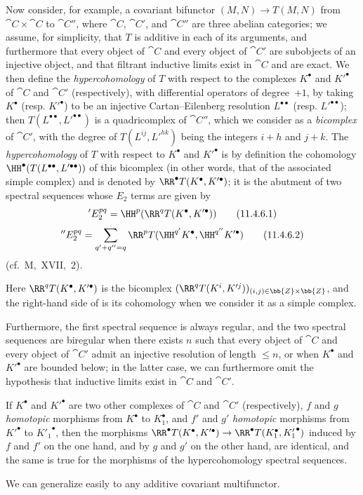 \begin{env}[11.4.6]
\label{0.11.4.6}
Now consider, for example, a covariant bifunctor $(M, N) \rightarrow T(M, N)$ from $\cat{C} \times \cat{C}$ to $\cat{C}''$, where $\cat{C}$, $\cat{C}'$, and $\cat{C}''$ are three abelian categories;
we assume, for simplicity, that $T$ is additive in each of its arguments, and furthermore that every object of $\cat{C}$ and every object of $\cat{C}'$ are subobjects of an injective object, 
and that filtrant inductive limits exist in $\cat{C}$ and are exact.
We then define the \emph{hypercohomology} of $T$ with respect to the complexes $K^\bullet$ and $K'^\bullet$ of $\cat{C}$ and $\cat{C}'$ (respectively), with differential operators of degree~$+1$, by taking $K^\bullet$ (resp. $K'^\bullet$) to be an injective Cartan--Eilenberg resolution $L^{\bullet\bullet}$ (resp. $L'^{\bullet\bullet}$);
then $T(L^{\bullet\bullet}, L'^{\bullet\bullet})$ is a quadricomplex of $\cat{C}''$, which we consider as a \emph{bicomplex} of $\cat{C}'$, with the degree of $T(L^{ij}, L'^{hk})$ being the integers $i+h$ and $j+k$.
The \emph{hypercohomology} of $T$ with respect to $K^\bullet$ and $K'^\bullet$ is by definition the cohomology $\HH^\bullet(T(L^{\bullet\bullet}, L'^{\bullet\bullet}))$ of this bicomplex  (in other words, that of the associated simple complex) and is denoted by $\RR^\bullet T(K^\bullet, K'^\bullet)$;
it is the abutment of two spectral sequences whose $E_2$ terms are given by
\[
\label{0.11.4.6.1}
  'E_2^{pq}
  = \HH^p(\RR^q T(K^\bullet, K'^\bullet))
\tag{11.4.6.1}
\]
\[
\label{0.11.4.6.2}
  ''E_2^{pq}
  = \sum_{q'+q''=q}\RR^p T(\HH^{q'}{K^\bullet},\HH^{q''}{K'^\bullet})
\tag{11.4.6.2}
\]
(cf.~M,~XVII,~2).

Here $\RR^q T(K^\bullet, K'^\bullet)$ is the bicomplex $(\RR^q T(K^i, K'^j))_{(i,j)\in \bb{Z}\times \bb{Z}}$, and the right-hand side of  is its cohomology when we consider it as a simple complex.

Furthermore, the first spectral sequence is always regular, and the two spectral sequences are biregular when there exists $n$ such that every object of $\cat{C}$ and every object of $\cat{C}'$ admit an injective resolution of length $\leq n$, or when $K^\bullet$ and $K'^\bullet$ are bounded below;
in the latter case, we can furthermore omit the hypothesis that inductive limits exist in $\cat{C}$ and $\cat{C}'$.

If $K^\bullet$ and $K'^\bullet$ are two other complexes of $\cat{C}$ and $\cat{C}'$ (respectively), $f$ and $g$ \emph{homotopic} morphisms from $K^\bullet$ to $K_1^\bullet$, 
and $f'$ and $g'$ \emph{homotopic} morphisms from $K'^\bullet$ to ${K'_1}^\bullet$, then the morphisms $\RR^\bullet  T(K^\bullet, K'^\bullet) \rightarrow \RR^\bullet  T(K_1^\bullet, {K'_1}^\bullet)$ induced by $f$ and $f'$ on the one hand, and by $g$ and $g'$ on the other hand, are identical, and the same is true for the morphisms of the hypercohomology spectral sequences.

We can generalize easily to any additive covariant multifunctor.
\end{env}

